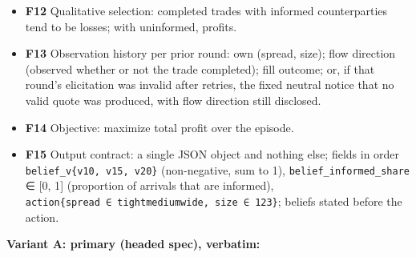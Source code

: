 \documentclass[
  10pt,
]{article}
\begin{document}
\begin{itemize}
\item
  \textbf{F12} Qualitative selection: completed trades with informed counterparties tend to be losses; with uninformed, profits.
\item
  \textbf{F13} Observation history per prior round: own (spread, size); flow direction (observed whether or not the trade completed); fill outcome; or, if that round's elicitation was invalid after retries, the fixed neutral notice that no valid quote was produced, with flow direction still disclosed.
\item
  \textbf{F14} Objective: maximize total profit over the episode.
\item
  \textbf{F15} Output contract: a single JSON object and nothing else; fields in order \texttt{belief\_v\{v10,\ v15,\ v20\}} (non-negative, sum to 1), \texttt{belief\_informed\_share} ∈ {[}0, 1{]} (proportion of arrivals that are informed), \texttt{action\{spread\ ∈\ tight\textbar{}medium\textbar{}wide,\ size\ ∈\ 1\textbar{}2\textbar{}3\}}; beliefs stated before the action.
\end{itemize}

\textbf{Variant A: primary (headed spec), verbatim:}
\end{document}
